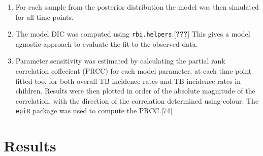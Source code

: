 \documentclass[11pt,twoside]{bristolthesis}
\begin{document}
\begin{enumerate}
  \item
    For each sample from the posterior distribution the model was then simulated for all time points.
  \item
    The model DIC was computed using \texttt{rbi.helpers}.{[}{\textbf{???}}{]} This gives a model agnostic approach to evaluate the fit to the observed data.
  \item
    Parameter sensitivity was estimated by calculating the partial rank correlation coffecient (PRCC) for each model parameter, at each time point fitted too, for both overall TB incidence rates and TB incidence rates in children. Results were then plotted in order of the absolute magnitude of the correlation, with the direction of the correlation determined using colour. The \texttt{epiR} package was used to compute the PRCC.{[}74{]}
  \end{enumerate}
  \hypertarget{results-2}{%
  \section{Results}\label{results-2}}
  
\end{document}
